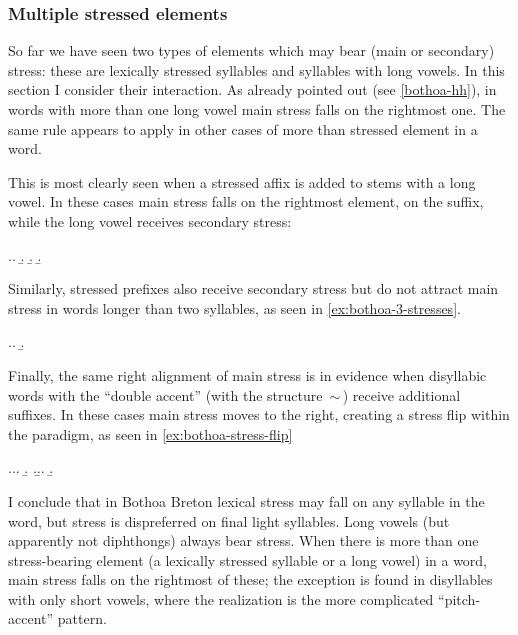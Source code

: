 \subsubsection{Multiple stressed elements}
\label{sec:mult-stress-elem}

So far we have seen two types of elements which may bear (main or secondary) stress: these are lexically stressed syllables and syllables with long vowels. In this section I consider their interaction. As already pointed out (see \cref{bothoa-hh}), in words with more than one long vowel main stress falls on the rightmost one. The same rule appears to apply in other cases of more than stressed element in a word.

This is most clearly seen when a stressed affix is added to stems with a long vowel. In these cases main stress falls on the rightmost element, \ie on the suffix, while the long vowel receives secondary stress:

\ex.\a.
\b.
\b.
\b.


Similarly, stressed prefixes also receive secondary stress but do not attract main stress in words longer than two syllables, as seen in \cref{ex:bothoa-3-stresses}.

\ex.\label{ex:bothoa-3-stresses}\a.
\b.


Finally, the same right alignment of main stress is in evidence when disyllabic words with the \enquote{double accent} (\ie with the structure \,$\sim$\,) receive additional suffixes. In these cases main stress moves to the right, creating a stress flip within the paradigm, as seen in \cref{ex:bothoa-stress-flip}

\ex.\label{ex:bothoa-stress-flip}\a.\a.
\b.
\z.\b.\a.
\b.

I conclude that in Bothoa Breton lexical stress may fall on any syllable in the word, but stress is dispreferred on final light syllables. Long vowels (but apparently not diphthongs) always bear stress. When there is more than one stress-bearing element (a lexically stressed syllable or a long vowel) in a word, main stress falls on the rightmost of these; the exception is found in disyllables with only short vowels, where the realization is the more complicated \enquote{pitch-accent} pattern.

